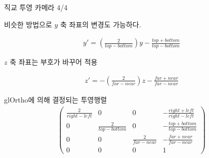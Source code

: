 \documentclass{beamer}
\begin{document}
\begin{frame}[fragile]{직교 투영 카메라 4/4}

비슷한 방법으로 $y$ 축 좌표의 변경도 가능하다.

\begin{eqnarray}
y' = \left ( \frac{2}{top-bottom} \right ) y - \frac{top+bottom}{top-bottom} \nonumber
\end{eqnarray}

$z$ 축 좌표는 부호가 바꾸어 적용

\begin{eqnarray}
z' = - \left ( \frac{2}{far-near} \right ) z - \frac{far+near}{far-near} \nonumber
\end{eqnarray}

glOrtho에 의해 결정되는 투영행렬 
\begin{eqnarray}
\left ( 
\begin{array}{cccc} \nonumber
\frac{2}{right-left}& 0 & 0 & - \frac{right+left}{right-left}\\ \nonumber
0& \frac{2}{top-bottom} & 0 & - \frac{top+bottom}{top-bottom}\\ \nonumber
0& 0 & \frac{2}{far-near} & - \frac{far+near}{far-near}\\ \nonumber
0& 0 & 0 & 1 \nonumber
\end{array} 
\right )
\end{eqnarray}

\end{frame}
\end{document}
